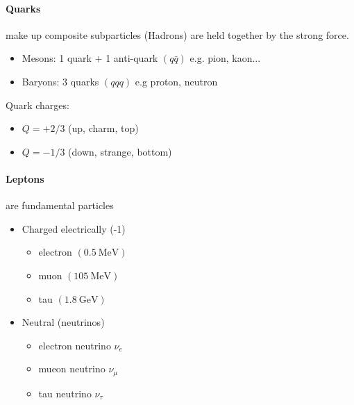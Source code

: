 \documentclass[../main.tex]{subfiles}
\begin{document}
\paragraph{Quarks} make up composite subparticles (Hadrons) are held together by the strong force.
\begin{itemize}
    \item Mesons: 1 quark + 1 anti-quark $(q\bar q)$ e.g. pion, kaon...
    \item Baryons: 3 quarks $(qqq)$ e.g proton, neutron
\end{itemize}

Quark charges:
\begin{itemize}
    \item $Q = +2/3$ (up, charm, top)
    \item $Q = -1/3$ (down, strange, bottom)
\end{itemize}

\paragraph{Leptons} are fundamental particles
\begin{itemize}
    \item Charged electrically (-1)
    \begin{itemize}
        \item electron $(\qty{0.5}{\mega\electronvolt})$
        \item muon $(\qty{105}{\mega\electronvolt})$
        \item tau $(\qty{1.8}{\giga\electronvolt})$
    \end{itemize}
    \item Neutral (neutrinos)
    \begin{itemize}
        \item electron neutrino $\nu_e$
        \item mueon neutrino $\nu_\mu$
        \item tau neutrino $\nu_\tau$
    \end{itemize}
\end{itemize}
\end{document}
